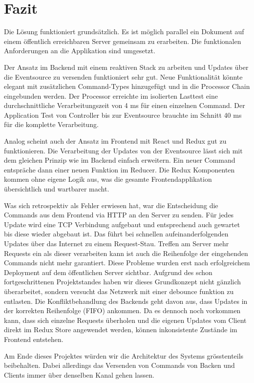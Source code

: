 \section{Fazit}

Die Lösung funktioniert grundsätzlich.
Es ist möglich parallel ein Dokument auf einem öffentlich erreichbaren Server gemeinsam zu erarbeiten.
Die funktionalen Anforderungen an die Applikation sind umgesetzt.

Der Ansatz im Backend mit einem reaktiven Stack zu arbeiten und Updates über die Eventsource zu versenden funktioniert sehr gut.
Neue Funktionalität könnte elegant mit zusätzlichen Command-Types hinzugefügt und in die Processor Chain eingebunden werden.
Der Processor erreichte im isolierten Lasttest eine durchschnittliche Verarbeitungszeit von 4 ms für einen einzelnen Command.
Der Application Test von Controller bis zur Eventsource brauchte im Schnitt 40 ms für die komplette Verarbeitung.

Analog scheint auch der Ansatz im Frontend mit React und Redux gut zu funktionieren.
Die Verarbeitung der Updates von der Eventsource lässt sich mit dem gleichen Prinzip wie im Backend einfach erweitern.
Ein neuer Command entspräche dann einer neuen Funktion im Reducer.
Die Redux Komponenten kommen ohne eigene Logik aus, was die gesamte Frontendapplikation übersichtlich und wartbarer macht.

Was sich retrospektiv als Fehler erwiesen hat, war die Entscheidung die Commands aus dem Frontend via HTTP an den Server zu senden.
Für jedes Update wird eine TCP Verbindung aufgebaut und entsprechend auch gewartet bis diese wieder abgebaut ist.
Das führt bei schnellen aufeinanderfolgenden Updates über das Internet zu einem Request-Stau.
Treffen am Server mehr Requests ein als dieser verarbeiten kann ist auch die Reihenfolge der eingehenden Commands nicht mehr garantiert.
Diese Probleme wurden erst nach erfolgreichem Deployment auf dem öffentlichen Server sichtbar.
Aufgrund des schon fortgeschrittenen Projektstandes haben wir dieses Grundkonzept nicht gänzlich überarbeitet, sondern versucht das Netzwerk mit einer debounce funktion zu entlasten.
Die Konfliktbehandlung des Backends geht davon aus, dass Updates in der korrekten Reihenfolge (FIFO) ankommen.
Da es dennoch noch vorkommen kann, dass sich einzelne Requests überholen und die eigenen Updates vom Client direkt im Redux Store angewendet werden, können inkonsistente Zustände im Frontend entstehen.

Am Ende dieses Projektes würden wir die Architektur des Systems grösstenteils beibehalten.
Dabei allerdings das Versenden von Commands von Backen und Clients immer über denselben Kanal gehen lassen.
